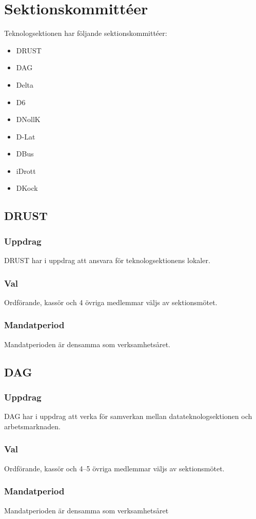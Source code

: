 \section{Sektionskommittéer}

Teknologsektionen har följande sektionskommittéer: 
\begin{itemize}
  \item DRUST 
  \item DAG 
  \item Delta 
  \item D6 
  \item DNollK
  \item D-Lat
  \item DBus
  \item iDrott
  \item DKock
\end{itemize}

\subsection{DRUST} 
\subsubsection{Uppdrag}
DRUST har i uppdrag att ansvara för teknologsektionens lokaler.
\subsubsection{Val}
Ordförande, kassör och 4 övriga medlemmar väljs av sektionsmötet. 
\subsubsection{Mandatperiod}
Mandatperioden är densamma som verksamhetsåret. 

\subsection{DAG}
\subsubsection{Uppdrag} 
DAG har i uppdrag att verka för samverkan mellan datateknologsektionen och arbetsmarknaden. 
\subsubsection{Val}
Ordförande, kassör och 4--5 övriga medlemmar väljs av sektionsmötet.
\subsubsection{Mandatperiod}
Mandatperioden är densamma som verksamhetsåret

